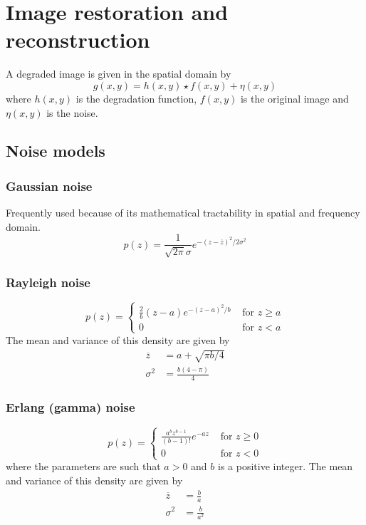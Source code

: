 \section{Image restoration and reconstruction }
A degraded image is given in the spatial domain by
\begin{equation}
	g(x,y) = h(x,y) \star f(x,y) + \eta(x,y)
\end{equation}
where $h(x,y)$ is the degradation function, $f(x,y)$ is the original image and $\eta(x,y)$ is the noise.

\subsection{Noise models  }
	\subsubsection{Gaussian noise}
		Frequently used because of its mathematical tractability in spatial and frequency domain.
		\begin{equation}
			p(z) = \frac{1}{\sqrt{2\pi} \sigma} e^{-\left(z-\overline{z}\right)^2 / 2\sigma^2}
		\end{equation}
		
	\subsubsection{Rayleigh noise}
		\begin{equation}
			p(z) = 
				\begin{cases}
					\frac{2}{b} \left(z-a\right) e^{-\left(z-a\right)^2/b} & \text{ for } z\geq a \\
					0 & \text{ for } z < a
				\end{cases}
		\end{equation}
		The mean and variance of this density are given by
		\begin{align}
			\overline{z} &= a + \sqrt{\pi b / 4} \\
			\sigma^2 &= \frac{b\left(4-\pi\right)}{4}
		\end{align}
		
	\subsubsection{Erlang (gamma) noise}
		\begin{equation}
			p(z) = 
				\begin{cases}
					\frac{a^bz^{b-1}}{\left(b-1\right)!} e^{-az} & \text{ for } z \geq 0 \\
					0 & \text{ for } z < 0
				\end{cases}
		\end{equation}	
		where the parameters are such that $a>0$ and $b$ is a positive integer. The mean and variance of this density are given by
		\begin{align}
			\overline{z} &= \frac{b}{a} \\
			\sigma^2 &= \frac{b}{a^2}
		\end{align}
		
